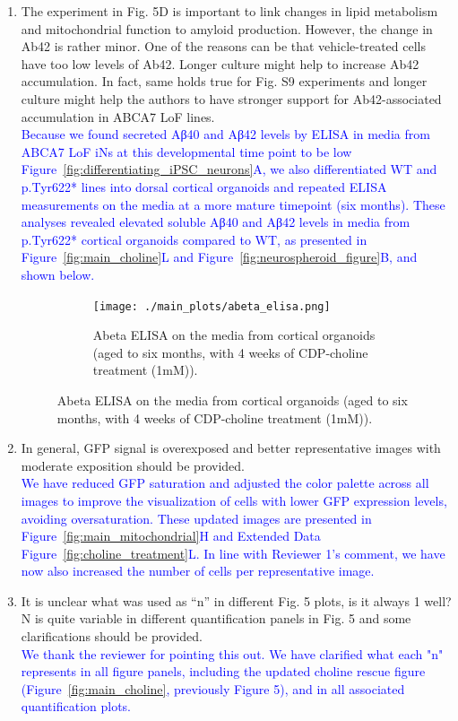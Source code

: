 \documentclass[12pt]{article}
\begin{document}
\begin{enumerate}
	\item The experiment in Fig. 5D is important to link changes in lipid metabolism and mitochondrial function to amyloid production. However, the change in Ab42 is rather minor. One of the reasons can be that vehicle-treated cells have too low levels of Ab42. Longer culture might help to increase Ab42 accumulation. In fact, same holds true for Fig. S9 experiments and longer culture might help the authors to have stronger support for Ab42-associated accumulation in ABCA7 LoF lines.\\
	\textcolor{blue}{Because we found secreted Aβ40 and Aβ42 levels by ELISA in media from ABCA7 LoF iNs at this developmental time point to be low Figure~\ref{fig:differentiating_iPSC_neurons}A, we also differentiated WT and p.Tyr622* lines into dorsal cortical organoids and repeated ELISA measurements on the media at a more mature timepoint (six months). These analyses revealed elevated soluble Aβ40 and Aβ42 levels in media from p.Tyr622* cortical organoids compared to WT, as presented in Figure~\ref{fig:main_choline}L and Figure~\ref{fig:neurospheroid_figure}B, and shown below.}

	\begin{figure}[H] 
		\centering
		\begin{subfigure}[t]{.6\textwidth}
			\caption{Abeta ELISA on the media from cortical organoids (aged to six months, with 4 weeks of CDP-choline treatment (1mM)).}
			\texttt{[image: ./main\_plots/abeta\_elisa.png]}        
		\end{subfigure}  
	\end{figure}

	\item In general, GFP signal is overexposed and better representative images with moderate exposition should be provided.\\
	\textcolor{blue}{We have reduced GFP saturation and adjusted the color palette across all images to improve the visualization of cells with lower GFP expression levels, avoiding oversaturation. These updated images are presented in Figure~\ref{fig:main_mitochondrial}H and Extended Data Figure~\ref{fig:choline_treatment}L. In line with Reviewer 1's comment, we have now also increased the number of cells per representative image.} 

	\item It is unclear what was used as “n” in different Fig. 5 plots, is it always 1 well? N is quite variable in different quantification panels in Fig. 5 and some clarifications should be provided.\\
	\textcolor{blue}{We thank the reviewer for pointing this out. We have clarified what each "n" represents in all figure panels, including the updated choline rescue figure (Figure~\ref{fig:main_choline}, previously Figure 5), and in all associated quantification plots.}

\end{enumerate}
\end{document}

